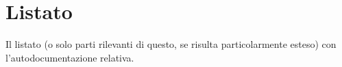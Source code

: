 \chapter{Listato}
\label{appendiceC}
\thispagestyle{empty}

\noindent Il listato (o solo parti rilevanti di questo, se risulta particolarmente esteso) con l'autodocumentazione relativa.